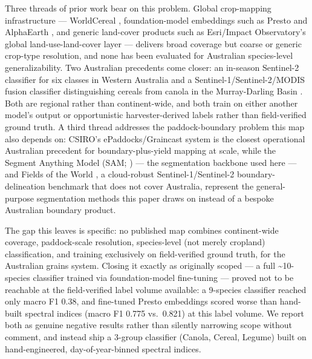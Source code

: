 Three threads of prior work bear on this problem. Global crop-mapping infrastructure --- WorldCereal \citep{vantricht2023worldcereal}, foundation-model embeddings such as Presto \citep{tseng2024presto} and AlphaEarth \citep{brown2025alphaearth}, and generic land-cover products such as Esri/Impact Observatory's global land-use-land-cover layer \citep{karra2021esri} --- delivers broad coverage but coarse or generic crop-type resolution, and none has been evaluated for Australian species-level generalizability. Two Australian precedents come closer: an in-season Sentinel-2 classifier for six classes in Western Australia \citep{sharma2026wa} and a Sentinel-1/Sentinel-2/MODIS fusion classifier distinguishing cereals from canola in the Murray-Darling Basin \citep{alshammari2024mdb}. Both are regional rather than continent-wide, and both train on either another model's output or opportunistic harvester-derived labels rather than field-verified ground truth. A third thread addresses the paddock-boundary problem this map also depends on: CSIRO's ePaddocks/Graincast system \citep{lawes2022graincast} is the closest operational Australian precedent for boundary-plus-yield mapping at scale, while the Segment Anything Model (SAM; \citealp{kirillov2023sam}) --- the segmentation backbone used here --- and Fields of the World \citep{kerner2024fields}, a cloud-robust Sentinel-1/Sentinel-2 boundary-delineation benchmark that does not cover Australia, represent the general-purpose segmentation methods this paper draws on instead of a bespoke Australian boundary product.

The gap this leaves is specific: no published map combines continent-wide coverage, paddock-scale resolution, species-level (not merely cropland) classification, and training exclusively on field-verified ground truth, for the Australian grains system. Closing it exactly as originally scoped --- a full \textasciitilde10-species classifier trained via foundation-model fine-tuning --- proved not to be reachable at the field-verified label volume available: a 9-species classifier reached only macro F1 0.38, and fine-tuned Presto embeddings scored worse than hand-built spectral indices (macro F1 0.775 vs.~0.821) at this label volume. We report both as genuine negative results rather than silently narrowing scope without comment, and instead ship a 3-group classifier (Canola, Cereal, Legume) built on hand-engineered, day-of-year-binned spectral indices.

